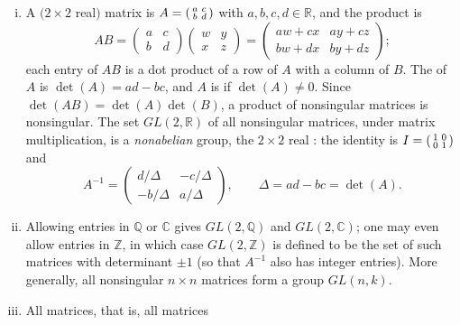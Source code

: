 \begin{eg}\label{eg:matrix-groups}
	\begin{enumerate}[(i)]
		\item A \((2\times 2\) real\()\) matrix is
		      \(A = \begin{psmallmatrix} a & c \\ b & d \end{psmallmatrix}\) with
		      \(a,b,c,d \in \mathbb{R}\), and the product is
		      \[
			      AB =
			      \begin{pmatrix} a & c \\ b & d \end{pmatrix}
			      \begin{pmatrix} w & y \\ x & z \end{pmatrix}
			      =
			      \begin{pmatrix} aw + cx & ay + cz \\ bw + dx & by + dz \end{pmatrix};
		      \]
		      each entry of \(AB\) is a dot product of a row of \(A\) with a column of
		      \(B\). The  of \(A\) is \(\det(A) = ad - bc\), and \(A\) is
		       if \(\det(A) \neq 0\). Since
		      \(\det(AB) = \det(A)\det(B)\), a product of nonsingular matrices is
		      nonsingular. The set \(GL(2,\mathbb{R})\) of all nonsingular matrices, under
		      matrix multiplication, is a \emph{nonabelian} group, the \(2\times 2\) real
		      : the identity is
		      \(I = \begin{psmallmatrix} 1&0 \\ 0&1\end{psmallmatrix}\) and
		      \[
			      A^{-1} = \begin{pmatrix} d/\Delta & -c/\Delta \\ -b/\Delta & a/\Delta \end{pmatrix},
			      \qquad \Delta = ad - bc = \det(A).
		      \]
		\item Allowing entries in \(\mathbb{Q}\) or \(\mathbb{C}\) gives
		      \(GL(2,\mathbb{Q})\) and \(GL(2,\mathbb{C})\); one may even allow entries in
		      \(\mathbb{Z}\), in which case \(GL(2,\mathbb{Z})\) is defined to be the set of
		      such matrices with determinant \(\pm 1\) (so that \(A^{-1}\) also has integer
		      entries). More generally, all nonsingular \(n \times n\) matrices form a group
		      \(GL(n, k)\).
		\item All  matrices, that is, all matrices

\end{enumerate}
\end{eg}

